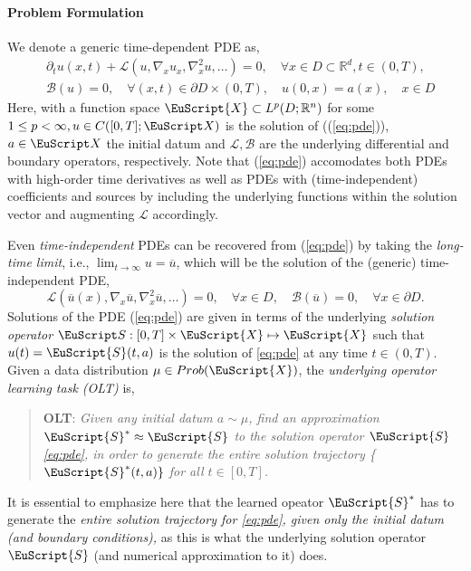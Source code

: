 \documentclass[reqno,10pt]{amsart}
\theoremstyle{plain}
\theoremstyle{definition}
\newcommand{\bb}[1]{\mathbb{#1}}
\newcommand{\cal}[1]{\mathcal{#1}}
\newcommand{\eus}[1]{\EuScript{#1}}
\begin{document}
\paragraph{\bf Problem Formulation} We denote a generic time-dependent PDE as,
\begin{equation}\label{eq:pde}
    \begin{split}
        &\partial_t u(x,t) + \cal L(u, \nabla_x u_x, \nabla^2_x u, \dots) = 0, \quad \forall x \in D \subset \bb R^d, t \in (0,T), \\
        &\cal B(u) = 0, \quad \forall(x,t) \in \partial D \times (0,T), \quad u(0,x) = a(x), \quad x \in D
    \end{split}
\end{equation}
Here, with a function space $\EuScript{X} \subset L^p(D;\bb R^n)$ for some $1 \leq p < \infty, u \in C([0,T];\EuScript X)$ is the solution of ((\ref{eq:pde})), $a \in \EuScript X$ the initial datum and $\cal L, \cal B$ are the underlying differential and boundary operators, respectively. Note that (\ref{eq:pde}) accomodates both PDEs with high-order time derivatives as well as  PDEs with (time-independent) coefficients and sources by including the underlying functions within the solution vector and augmenting $\cal L$ accordingly.

\noindent Even {\it time-independent} PDEs can be recovered from (\ref{eq:pde}) by taking the {\it long-time limit}, i.e., $\lim_{t \to\infty} u = \overline{u}$, which will be the solution of the (generic) time-independent PDE,
\begin{equation}
    \cal L(\overline{u}(x), \nabla_x \overline{u}, \nabla^2_x\overline{u}, \dots) = 0, \quad \forall x \in D, \quad \cal B(\overline{u}) = 0, \quad \forall x \in \partial D.
\end{equation}
Solutions of the PDE (\ref{eq:pde}) are given in terms of the underlying {\it solution operator} $\EuScript S: [0,T] \times \eus X \mapsto \eus X$ such that $u(t) = \eus S(t,a)$ is the solution of \ref{eq:pde} at any time $t \in (0,T)$. Given a data distribution $\mu \in Prob(\eus X)$, the {\it underlying operator learning task (OLT)} is,

\begin{quote}
    {\bf OLT}: {\it Given any initial datum $a \sim \mu$, find an approximation $\eus S^* \approx \eus S$ to the solution operator $\eus S$ \ref{eq:pde}, in order to generate the entire solution trajectory \{$\eus S^*(t,a)\}$ for all $t\in [0,T]$.}
\end{quote}
It is essential to emphasize here that the learned opeator $\eus S^*$ has to generate the {\it entire solution trajectory for \ref{eq:pde}, given only the initial datum (and boundary conditions),} as this is what the underlying solution operator $\eus S$ (and numerical approximation to it) does.
\end{document}
